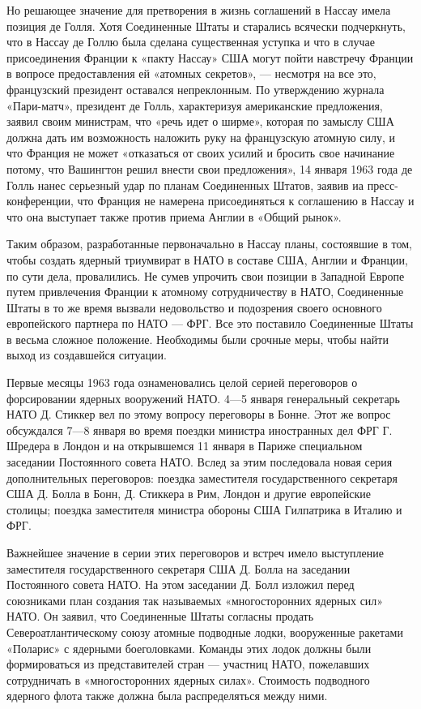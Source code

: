 \documentclass[12pt, a4paper, openany]{book}
\begin{document}
Но решающее значение для претворения в жизнь соглашений в Нассау имела позиция де Голля. Хотя Соединенные Штаты и старались всячески подчеркнуть, что в Нассау де Голлю была сделана существенная уступка и что в случае присоединения Франции к «пакту Нассау» США могут пойти навстречу Франции в вопросе предоставления ей «атомных секретов», — несмотря на все это, французский президент оставался непреклонным. По утверждению журнала «Пари-матч», президент де Голль, характеризуя американские предложения, заявил своим министрам, что «речь идет о ширме», которая по замыслу США должна дать им возможность наложить руку на французскую атомную силу, и что Франция не может «отказаться от своих усилий и бросить свое начинание потому, что Вашингтон решил внести свои предложения», 14 января 1963 года де Голль нанес серьезный удар по планам Соединенных Штатов, заявив иа пресс-конференции, что Франция не намерена присоединяться к соглашению в Нассау и что она выступает также против приема Англии в «Общий рынок».

Таким образом, разработанные первоначально в Нассау планы, состоявшие в том, чтобы создать ядерный триумвират в НАТО в составе США, Англии и Франции, по сути дела, провалились. Не сумев упрочить свои позиции в Западной Европе путем привлечения Франции к атомному сотрудничеству в НАТО, Соединенные Штаты в то же время вызвали недовольство и подозрения своего основного европейского партнера по НАТО — ФРГ. Все это поставило Соединенные Штаты в весьма сложное положение. Необходимы были срочные меры, чтобы найти выход из создавшейся ситуации.

Первые месяцы 1963 года ознаменовались целой серией переговоров о форсировании ядерных вооружений НАТО. 4—5 января генеральный секретарь НАТО Д. Стиккер вел по этому вопросу переговоры в Бонне. Этот же вопрос обсуждался 7—8 января во время поездки министра иностранных дел ФРГ Г. Шредера в Лондон и на открывшемся 11 января в Париже специальном заседании Постоянного совета НАТО. Вслед за этим последовала новая серия дополнительных переговоров: поездка заместителя государственного секретаря США Д. Болла в Бонн, Д. Стиккера в Рим, Лондон и другие европейские столицы; поездка заместителя министра обороны США Гилпатрика в Италию и ФРГ.

Важнейшее значение в серии этих переговоров и встреч имело выступление заместителя государственного секретаря США Д. Болла на заседании Постоянного совета НАТО. На этом заседании Д. Болл изложил перед союзниками план создания так называемых «многосторонних ядерных сил» НАТО. Он заявил, что Соединенные Штаты согласны продать Североатлантическому союзу атомные подводные лодки, вооруженные ракетами «Поларис» с ядерными боеголовками. Команды этих лодок должны были формироваться из представителей стран — участниц НАТО, пожелавших сотрудничать в «многосторонних ядерных силах». Стоимость подводного ядерного флота также должна была распределяться между ними.
\end{document}
